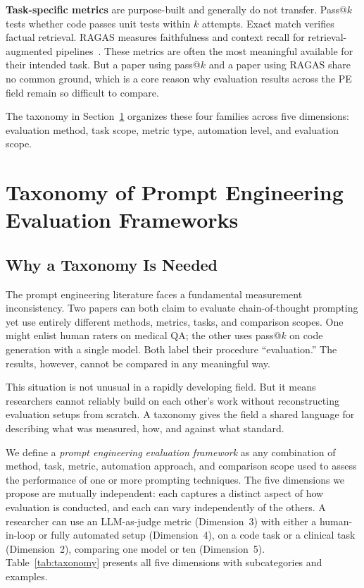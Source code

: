 \documentclass[journal]{IEEEtran}
\begin{document}
\textbf{Task-specific metrics} are purpose-built and generally do not transfer.
Pass@$k$ tests whether code passes unit tests within $k$ attempts. Exact
match verifies factual retrieval. RAGAS measures faithfulness and context
recall for retrieval-augmented pipelines~\cite{rageval2024}. These metrics are
often the most meaningful available for their intended task. But a paper using pass@$k$
and a paper using RAGAS share no common ground, which is a core reason why evaluation results across the PE field remain so difficult to compare.

The taxonomy in Section~\ref{sec:taxonomy} organizes these four families across five dimensions: evaluation method, task scope, metric type, automation level, and evaluation scope.

\section{Taxonomy of Prompt Engineering Evaluation Frameworks}
\label{sec:taxonomy}

\subsection{Why a Taxonomy Is Needed}

The prompt engineering literature faces a fundamental measurement
inconsistency. Two papers can both claim to evaluate chain-of-thought
prompting yet use entirely different methods, metrics, tasks, and
comparison scopes. One might enlist human raters on medical QA; the other
uses pass@$k$ on code generation with a single model. Both label their
procedure ``evaluation.'' The results, however,
cannot be compared in any meaningful way.

This situation is not unusual in a rapidly developing field. But it means researchers cannot
reliably build on each other's work without reconstructing evaluation
setups from scratch. A taxonomy gives the field a shared language for
describing what was measured, how, and against what standard.

We define a \textit{prompt engineering evaluation framework} as any
combination of method, task, metric, automation approach, and comparison
scope used to assess the performance of one or more prompting techniques.
The five dimensions we propose are mutually independent: each captures a distinct
aspect of how evaluation is conducted, and each can vary independently
of the others. A researcher can use an LLM-as-judge metric
(Dimension~3) with either a human-in-loop or fully automated setup
(Dimension~4), on a code task or a clinical task (Dimension~2),
comparing one model or ten (Dimension~5). Table~\ref{tab:taxonomy}
presents all five dimensions with subcategories and examples.
\end{document}
